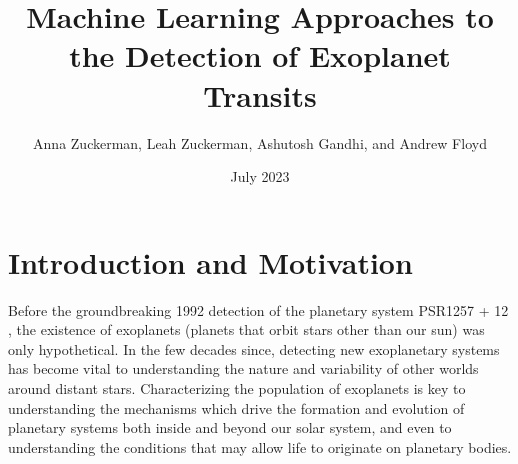 \documentclass{article}
\title{Machine Learning Approaches to the Detection of Exoplanet Transits}
\author{Anna Zuckerman, Leah Zuckerman, Ashutosh Gandhi, and Andrew Floyd}
\date{July 2023}
\begin{document}


\maketitle

\section{Introduction and Motivation}



Before the groundbreaking 1992 detection of the planetary system PSR1257 + 12 \citep{Wolszczan1992}, the existence of exoplanets (planets that orbit stars other than our sun) was only hypothetical. In the few decades since, detecting new exoplanetary systems has become vital to understanding the nature and variability of other worlds around distant stars. Characterizing the population of exoplanets is key to understanding the mechanisms which drive the formation and evolution of planetary systems both inside and beyond our solar system, and even to understanding the conditions that may allow life to originate on planetary bodies.
\end{document}
